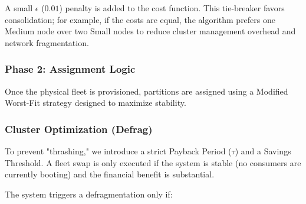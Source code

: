 ﻿\documentclass[conference]{IEEEtran}
\begin{document}
A small $\epsilon$ ($0.01$) penalty is added to the cost function. This tie-breaker favors consolidation; for example, if the costs are equal, the algorithm prefers one Medium node over two Small nodes to reduce cluster management overhead and network fragmentation.


\subsubsection{Phase 2: Assignment Logic}


Once the physical fleet is provisioned, partitions are assigned using a Modified Worst-Fit strategy designed to maximize stability.










\subsubsection{Cluster Optimization (Defrag)}


To prevent "thrashing," we introduce a strict Payback Period ($\tau$) and a Savings Threshold. A fleet swap is only executed if the system is stable (no consumers are currently booting) and the financial benefit is substantial.





The system triggers a defragmentation only if:
\end{document}

